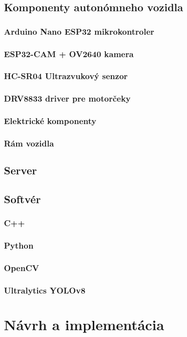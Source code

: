 \subsection{Komponenty autonómneho vozidla}
\subsubsection{Arduino Nano ESP32 mikrokontroler}
\subsubsection{ESP32-CAM + OV2640 kamera}
\subsubsection{HC-SR04 Ultrazvukový senzor}
\subsubsection{DRV8833 driver pre motorčeky}
\subsubsection{Elektrické komponenty}
\subsubsection{Rám vozidla}
\subsection{Server}
\subsection{Softvér}
\subsubsection{C++}
\subsubsection{Python}
\subsubsection{OpenCV}
\subsubsection{Ultralytics YOLOv8}

\section{Návrh a implementácia}\label{sec:NavrhAImplementacia}
